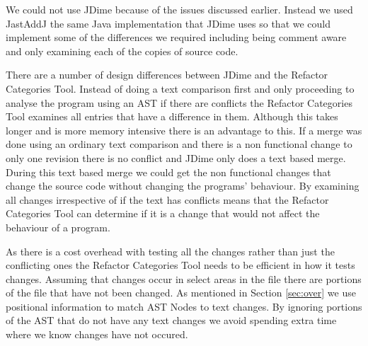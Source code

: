 We could not use JDime because of the issues discussed earlier. Instead we used JastAddJ the same Java implementation that JDime uses so that we could implement some of the differences we required including being comment aware and only examining each of the copies of source code.

There are a number of design differences between JDime and the Refactor Categories Tool.
 Instead of doing a text comparison first and only proceeding to analyse the program using an AST if there are conflicts the Refactor Categories Tool examines all entries that have a difference in them.
Although this takes longer and is more memory intensive there is an advantage to this.  
If a merge was done using an ordinary text comparison and there is a non functional change to only one revision there is no conflict and JDime only does a text based merge.  
During this text based merge we could get the non functional changes that change the source code without changing the programs' behaviour. By examining all changes irrespective of if the text has conflicts means that the Refactor Categories Tool can determine if it is a change that would not affect the behaviour of a program.

As there is a cost overhead with testing all the changes rather than just the conflicting ones the Refactor Categories Tool needs to be efficient in how it tests changes.  Assuming that changes occur in select areas in the file there are portions of the file that have not been changed.  
As mentioned in Section \ref{sec:over} we use positional information to match AST Nodes to text changes.  By ignoring portions of the AST that do not have any text changes we avoid spending extra time where we know changes have not occured.


